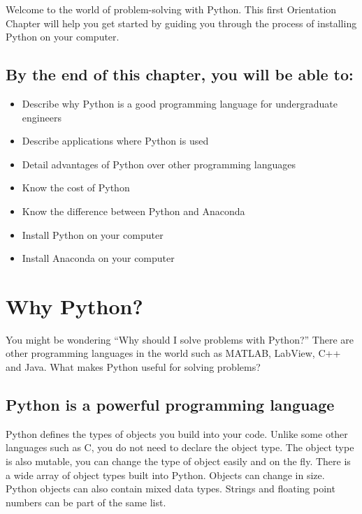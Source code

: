 \documentclass{book}
\providecommand{\tightlist}{%
      \setlength{\itemsep}{0pt}\setlength{\parskip}{0pt}}
\begin{document}
    
        Welcome to the world of problem-solving with Python. This first
Orientation Chapter will help you get started by guiding you through the
process of installing Python on your computer.
    




    
        \subsection{By the end of this chapter, you will be able
to:}\label{by-the-end-of-this-chapter-you-will-be-able-to}

\begin{itemize}
\tightlist
\item
  Describe why Python is a good programming language for undergraduate
  engineers
\item
  Describe applications where Python is used
\item
  Detail advantages of Python over other programming languages
\item
  Know the cost of Python
\item
  Know the difference between Python and Anaconda
\item
  Install Python on your computer
\item
  Install Anaconda on your computer
\end{itemize}
    




    
        \section{Why Python?}\label{why-python}
    




    
        You might be wondering ``Why should I solve problems with Python?''
There are other programming languages in the world such as MATLAB,
LabView, C++ and Java. What makes Python useful for solving problems?
    




    
        \subsection{Python is a powerful programming
language}\label{python-is-a-powerful-programming-language}

Python defines the types of objects you build into your code. Unlike
some other languages such as C, you do not need to declare the object
type. The object type is also mutable, you can change the type of object
easily and on the fly. There is a wide array of object types built into
Python. Objects can change in size. Python objects can also contain
mixed data types. Strings and floating point numbers can be part of the
same list.
\end{document}
